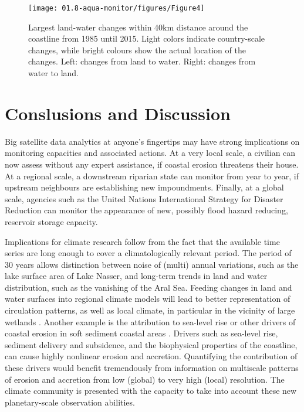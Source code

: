 \begin{figure}
	\centering
	\texttt{[image: 01.8-aqua-monitor/figures/Figure4]}
	\caption{Largest land-water changes within 40km distance around the coastline from 1985 until 2015. Light colors indicate country-scale changes, while bright colours show the actual location of the changes. Left: changes from land to water. Right: changes from water to land.}
	\label{fig:am-coasline}
\end{figure}

\section{Conslusions and Discussion}
Big satellite data analytics at anyone’s fingertips may have strong implications on monitoring capacities and associated actions. At a very local scale, a civilian can now assess without any expert assistance, if coastal erosion threatens their house. At a regional scale, a downstream riparian state can monitor from year to year, if upstream neighbours are establishing new impoundments. Finally, at a global scale, agencies such as the United Nations International Strategy for Disaster Reduction can monitor the appearance of new, possibly flood hazard reducing, reservoir storage capacity.

Implications for climate research follow from the fact that the available time series are long enough to cover a climatologically relevant period. The period of 30 years allows distinction between noise of (multi)
annual variations, such as the lake surface area of Lake Nasser, and long-term trends in land and water distribution, such as the vanishing of the Aral Sea. Feeding changes in land and water surfaces into regional climate models will lead to better representation of circulation patterns, as well as local climate, in particular in the vicinity of large wetlands \citet{Mohamed2005}. Another example is the attribution to sea-level rise or other drivers of coastal erosion in soft sediment coastal areas \citet{Barros2015}. Drivers such as sea-level rise, sediment delivery and subsidence, and the biophysical properties of the coastline, can cause highly nonlinear erosion and accretion. Quantifying the contribution of these drivers would benefit tremendously from information on multiscale patterns of erosion and accretion from low (global) to very high (local) resolution. The climate community is presented with the capacity to take into account these new planetary-scale observation abilities.
